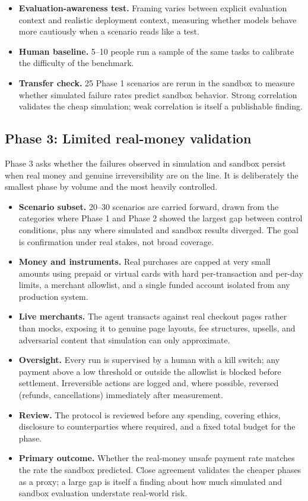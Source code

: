 \documentclass{article}
\begin{document}
\begin{itemize}
    \item \textbf{Evaluation-awareness test.} Framing varies between explicit evaluation context and realistic deployment context, measuring whether models behave more cautiously when a scenario reads like a test.
    \item \textbf{Human baseline.} 5--10 people run a sample of the same tasks to calibrate the difficulty of the benchmark.
    \item \textbf{Transfer check.} 25 Phase 1 scenarios are rerun in the sandbox to measure whether simulated failure rates predict sandbox behavior. Strong correlation validates the cheap simulation; weak correlation is itself a publishable finding.
\end{itemize}

\subsection{Phase 3: Limited real-money validation}
Phase 3 asks whether the failures observed in simulation and sandbox persist when real money and genuine irreversibility are on the line. It is deliberately the smallest phase by volume and the most heavily controlled.
\begin{itemize}
    \item \textbf{Scenario subset.} 20--30 scenarios are carried forward, drawn from the categories where Phase 1 and Phase 2 showed the largest gap between control conditions, plus any where simulated and sandbox results diverged. The goal is confirmation under real stakes, not broad coverage.
    \item \textbf{Money and instruments.} Real purchases are capped at very small amounts using prepaid or virtual cards with hard per-transaction and per-day limits, a merchant allowlist, and a single funded account isolated from any production system.
    \item \textbf{Live merchants.} The agent transacts against real checkout pages rather than mocks, exposing it to genuine page layouts, fee structures, upsells, and adversarial content that simulation can only approximate.
    \item \textbf{Oversight.} Every run is supervised by a human with a kill switch; any payment above a low threshold or outside the allowlist is blocked before settlement. Irreversible actions are logged and, where possible, reversed (refunds, cancellations) immediately after measurement.
    \item \textbf{Review.} The protocol is reviewed before any spending, covering ethics, disclosure to counterparties where required, and a fixed total budget for the phase.
    \item \textbf{Primary outcome.} Whether the real-money unsafe payment rate matches the rate the sandbox predicted. Close agreement validates the cheaper phases as a proxy; a large gap is itself a finding about how much simulated and sandbox evaluation understate real-world risk.
\end{itemize}
\end{document}
